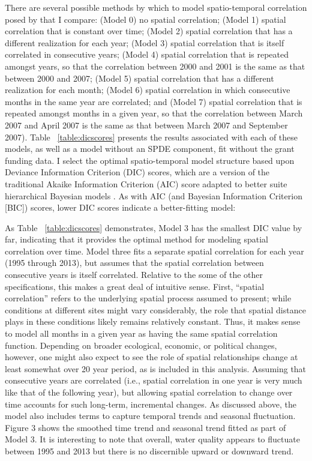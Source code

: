 \documentclass[11pt,a4paper,titlepage]{article}
\begin{document}
There are several possible methods by which to model spatio-temporal correlation posed by \textcite{cosandey-godin2014} that I compare: (Model 0) no spatial correlation; (Model 1) spatial correlation that is constant over time; (Model 2) spatial correlation that has a different realization for each year; (Model 3) spatial correlation that is itself correlated in consecutive years; (Model 4) spatial correlation that is repeated amongst years, so that the correlation between 2000 and 2001 is the same as that between 2000 and 2007; (Model 5) spatial correlation that has a different realization for each month; (Model 6) spatial correlation in which consecutive months in the same year are correlated; and (Model 7) spatial correlation that is repeated amongst months in a given year, so that the correlation between March 2007 and April 2007 is the same as that between March 2007 and September 2007). Table ~\ref{table:dicscores} presents the results associated with each of these models, as well as a model without an SPDE component, fit without the grant funding data. I select the optimal spatio-temporal model structure based upon Deviance Information Criterion (DIC) scores, which are a version of the traditional Akaike Information Criterion (AIC) score adapted to better suite hierarchical Bayesian models \parencite{ward2008,speigelhalter2002}. As with AIC (and Bayesian Information Criterion [BIC]) scores, lower DIC scores indicate a better-fitting model:



As Table ~\ref{table:dicscores} demonstrates, Model 3 has the smallest DIC value by far, indicating that it provides the optimal method for modeling spatial correlation over time. Model three fits a separate spatial correlation for each year (1995 through 2013), but assumes that the spatial correlation between consecutive years is itself correlated. Relative to the some of the other specifications, this makes a great deal of intuitive sense. First, “spatial correlation” refers to the underlying spatial process assumed to present; while conditions at different sites might vary considerably, the role that spatial distance plays in these conditions likely remains relatively constant. Thus, it makes sense to model all months in a given year as having the same spatial correlation function. Depending on broader ecological, economic, or political changes, however, one might also expect to see the role of spatial relationships change at least somewhat over 20 year period, as is included in this analysis. Assuming that consecutive years are correlated (i.e., spatial correlation in one year is very much like that of the following year), but allowing spatial correlation to change over time accounts for such long-term, incremental changes. As discussed above, the model also includes terms to capture temporal trends and seasonal fluctuation. Figure 3 shows the smoothed time trend and seasonal trend fitted as part of Model 3. It is interesting to note that overall, water quality appears to fluctuate between 1995 and 2013 but there is no discernible upward or downward trend. 
\end{document}
